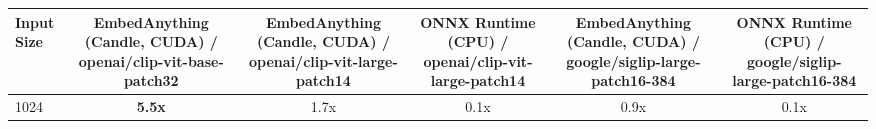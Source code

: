 \begin{tabular}{lccccc}
\toprule
\textbf{Input Size} & \textbf{EmbedAnything (Candle, CUDA) / openai/clip-vit-base-patch32} & \textbf{EmbedAnything (Candle, CUDA) / openai/clip-vit-large-patch14} & \textbf{ONNX Runtime (CPU) / openai/clip-vit-large-patch14} & \textbf{EmbedAnything (Candle, CUDA) / google/siglip-large-patch16-384} & \textbf{ONNX Runtime (CPU) / google/siglip-large-patch16-384} \\
\midrule
1024 & \textbf{5.5x} & 1.7x & 0.1x & 0.9x & 0.1x \\
\bottomrule
\end{tabular}
